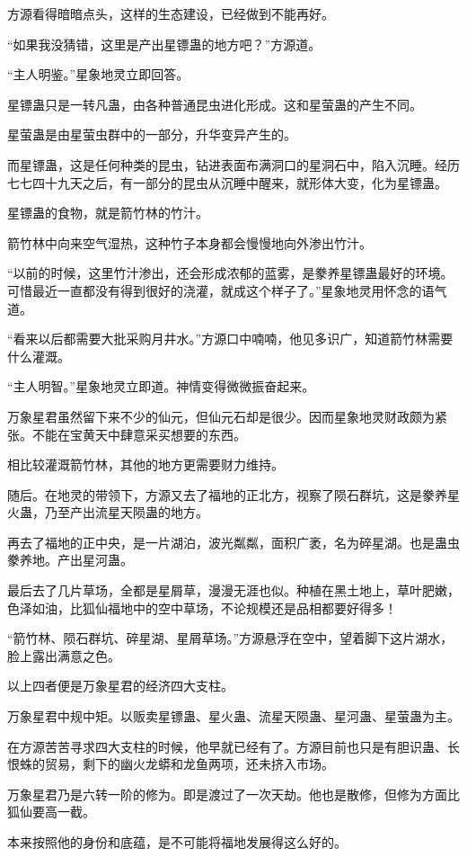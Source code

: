 \begin{this_body}
方源看得暗暗点头，这样的生态建设，已经做到不能再好。

“如果我没猜错，这里是产出星镖蛊的地方吧？”方源道。

“主人明鉴。”星象地灵立即回答。

星镖蛊只是一转凡蛊，由各种普通昆虫进化形成。这和星萤蛊的产生不同。

星萤蛊是由星萤虫群中的一部分，升华变异产生的。

而星镖蛊，这是任何种类的昆虫，钻进表面布满洞口的星洞石中，陷入沉睡。经历七七四十九天之后，有一部分的昆虫从沉睡中醒来，就形体大变，化为星镖蛊。

星镖蛊的食物，就是箭竹林的竹汁。

箭竹林中向来空气湿热，这种竹子本身都会慢慢地向外渗出竹汁。

“以前的时候，这里竹汁渗出，还会形成浓郁的蓝雾，是豢养星镖蛊最好的环境。可惜最近一直都没有得到很好的浇灌，就成这个样子了。”星象地灵用怀念的语气道。

“看来以后都需要大批采购月井水。”方源口中喃喃，他见多识广，知道箭竹林需要什么灌溉。

“主人明智。”星象地灵立即道。神情变得微微振奋起来。

万象星君虽然留下来不少的仙元，但仙元石却是很少。因而星象地灵财政颇为紧张。不能在宝黄天中肆意采买想要的东西。

相比较灌溉箭竹林，其他的地方更需要财力维持。

随后。在地灵的带领下，方源又去了福地的正北方，视察了陨石群坑，这是豢养星火蛊，乃至产出流星天陨蛊的地方。

再去了福地的正中央，是一片湖泊，波光粼粼，面积广袤，名为碎星湖。也是蛊虫豢养地。产出星河蛊。

最后去了几片草场，全都是星屑草，漫漫无涯也似。种植在黑土地上，草叶肥嫩，色泽如油，比狐仙福地中的空中草场，不论规模还是品相都要好得多！

“箭竹林、陨石群坑、碎星湖、星屑草场。”方源悬浮在空中，望着脚下这片湖水，脸上露出满意之色。

以上四者便是万象星君的经济四大支柱。

万象星君中规中矩。以贩卖星镖蛊、星火蛊、流星天陨蛊、星河蛊、星萤蛊为主。

在方源苦苦寻求四大支柱的时候，他早就已经有了。方源目前也只是有胆识蛊、长恨蛛的贸易，剩下的幽火龙蟒和龙鱼两项，还未挤入市场。

万象星君乃是六转一阶的修为。即是渡过了一次天劫。他也是散修，但修为方面比狐仙要高一截。

本来按照他的身份和底蕴，是不可能将福地发展得这么好的。


\end{this_body}
